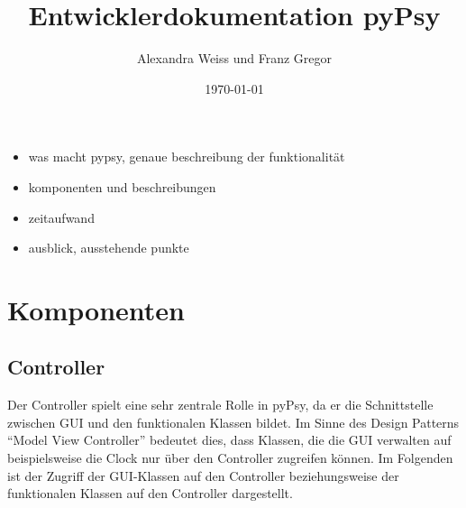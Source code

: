 \documentclass[a4paper,draft]{scrartcl}
\title{Entwicklerdokumentation pyPsy}
\author{Alexandra Weiss und Franz Gregor}
\date{\today}
\begin{document}
\maketitle
\newpage
\tableofcontents
\begin{itemize}
	\item was macht pypsy, genaue beschreibung der funktionalität
	\item komponenten und beschreibungen 
	\item zeitaufwand
	\item ausblick, ausstehende punkte
\end{itemize}
\newpage
\section{Komponenten}
\subsection{Controller}
  Der Controller spielt eine sehr zentrale Rolle in pyPsy, da er die Schnittstelle zwischen GUI und den funktionalen Klassen bildet. Im Sinne des Design Patterns "`Model View Controller"' bedeutet dies, dass Klassen, die die GUI verwalten auf beispielsweise die Clock nur über den Controller zugreifen können. Im Folgenden ist der Zugriff der GUI-Klassen auf den Controller beziehungsweise der funktionalen Klassen auf den Controller dargestellt.
\end{document}
